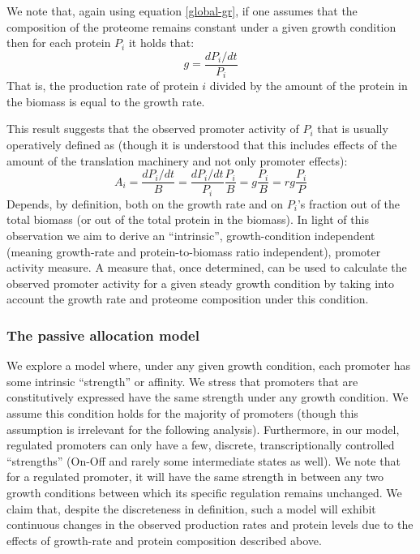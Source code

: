 \documentclass[a4page]{report}
\begin{document}
We note that, again using equation \ref{global-gr}, if one assumes that the composition of the proteome remains constant under a given growth condition then for each protein $P_i$ it holds that:
\[g=\frac{dP_i/dt}{P_i}\]
That is, the production rate of protein $i$ divided by the amount of the protein in the biomass is equal to the growth rate.

This result suggests that the observed promoter activity of $P_i$ that is usually operatively defined as (though it is understood that this includes effects of the amount of the translation machinery and not only promoter effects):
\begin{equation}
\label{pa-gr-relation}
A_i=\frac{dP_i/dt}{B}=\frac{dP_i/dt}{P_i}\frac{P_i}{B}=g\frac{P_i}{B}=rg\frac{P_i}{P}
\end{equation}
Depends, by definition, both on the growth rate and on $P_i$’s fraction out of the total biomass (or out of the total protein in the biomass).
In light of this observation we aim to derive an “intrinsic”, growth-condition independent (meaning growth-rate and protein-to-biomass ratio independent), promoter activity measure.
A measure that, once determined, can be used to calculate the observed promoter activity for a given steady growth condition by taking into account the growth rate and proteome composition under this condition.
\subsubsection{The passive allocation model}
We explore a model where, under any given growth condition, each promoter has some intrinsic ``strength'' or affinity.
We stress that promoters that are constitutively expressed have the same strength under any growth condition.
We assume this condition holds for the majority of promoters (though this assumption is irrelevant for the following analysis).
Furthermore, in our model, regulated promoters can only have a few, discrete, transcriptionally controlled ``strengths'' (On-Off and rarely some intermediate states as well).
We note that for a regulated promoter, it will have the same strength in between any two growth conditions between which its specific regulation remains unchanged.
We claim that, despite the discreteness in definition, such a model will exhibit continuous changes in the observed production rates and protein levels due to the effects of growth-rate and protein composition described above.
\end{document}
